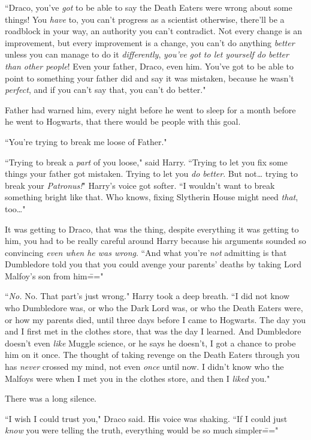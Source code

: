 ``Draco, you've \emph{got} to be able to say the Death Eaters were wrong about some things! You \emph{have} to, you can't progress as a scientist otherwise, there'll be a roadblock in your way, an authority you can't contradict. Not every change is an improvement, but every improvement is a change, you can't do anything \emph{better} unless you can manage to do it \emph{differently}, \emph{you've got to let yourself do better than other people}! Even your father, Draco, even him. You've got to be able to point to something your father did and say it was mistaken, because he wasn't \emph{perfect}, and if you can't say that, you can't do better."

Father had warned him, every night before he went to sleep for a month before he went to Hogwarts, that there would be people with this goal.

``You're trying to break me loose of Father."

``Trying to break a \emph{part} of you loose," said Harry. ``Trying to let you fix some things your father got mistaken. Trying to let you \emph{do better}. But not{\ldots} trying to break your \emph{Patronus!}" Harry's voice got softer. ``I wouldn't want to break something bright like that. Who knows, fixing Slytherin House might need \emph{that}, too{\ldots}"

It was getting to Draco, that was the thing, despite everything it was getting to him, you had to be really careful around Harry because his arguments sounded so convincing \emph{even when he was wrong}. ``And what you're \emph{not} admitting is that Dumbledore told you that you could avenge your parents' deaths by taking Lord Malfoy's son from him\==="

``\emph{No.} No. That part's just wrong." Harry took a deep breath. ``I did not know who Dumbledore was, or who the Dark Lord was, or who the Death Eaters were, or how my parents died, until three days before I came to Hogwarts. The day you and I first met in the clothes store, that was the day I learned. And Dumbledore doesn't even \emph{like} Muggle science, or he says he doesn't, I got a chance to probe him on it once. The thought of taking revenge on the Death Eaters through you has \emph{never} crossed my mind, not even \emph{once} until now. I didn't know who the Malfoys were when I met you in the clothes store, and then I \emph{liked} you."

There was a long silence.

``I wish I could trust you," Draco said. His voice was shaking. ``If I could just \emph{know} you were telling the truth, everything would be so much simpler\==="

